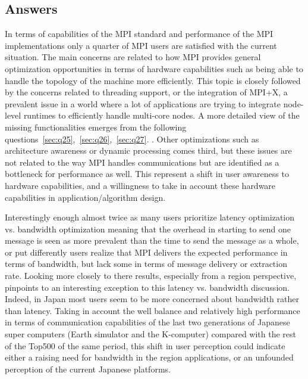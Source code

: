 
\subsection{Answers}


In terms of capabilities of the MPI standard and performance of the MPI
implementations only a quarter of MPI users are satisfied with the current
situation. The main concerns are related to how MPI provides general
optimization opportunities in terms of hardware capabilities such as being able
to handle the topology of the machine more efficiently. This topic is closely
followed by the concerns related to threading support, or the integration of
MPI+X, a prevalent issue in a world where a lot of applications are trying to
integrate node-level runtimes to efficiently handle multi-core nodes.
%
A more detailed view of the missing functionalities emerges from the following questions~\ref{sec:q25},~\ref{sec:q26},~\ref{sec:q27}.
.
%
Other optimizations such as architecture awareness or dynamic processing comes
third, but these issues are not related to the way MPI handles communications
but are identified as a bottleneck for performance as well. This represent a
shift in user awareness to hardware capabilities, and a willingness to take in
account these hardware capabilities in application/algorithm design.

Interestingly enough almost twice as many users prioritize latency optimization
vs. bandwidth optimization meaning that the overhead in starting to send one
message is seen as more prevalent than the time to send the message as a whole,
or put differently users realize that MPI delivers the expected performance in
terms of bandwidth, but lack some in terms of message delivery or extraction
rate.
%
Looking more closely to there results, especially from a region perspective,
pinpoints to an interesting exception to this latency vs. bandwidth discussion.
Indeed, in Japan most users seem to be more concerned about bandwidth rather
than latency. Taking in account the well balance and relatively high performance
in terms of communication capabilities of the last two generations of Japanese
super computers (Earth simulator and the K-computer) compared with the rest of
the Top500 of the same period, this shift in user perception could indicate
either a raising need for bandwidth in the region applications, or an unfounded
perception of the current Japanese platforms.
%
 

